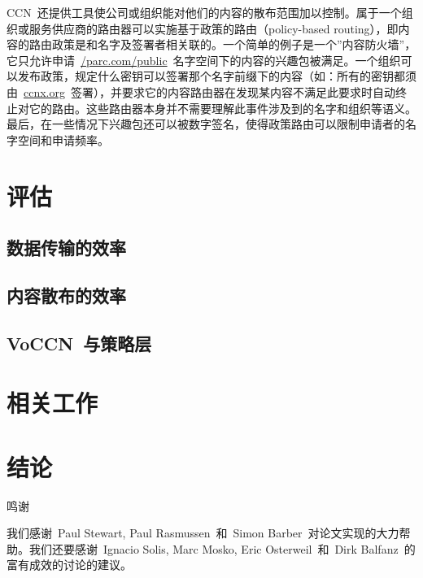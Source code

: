 CCN~还提供工具使公司或组织能对他们的内容的散布范围加以控制。属于一个组织或服务供应商的路由器可以实施基于政策的路由（policy-based routing），即内容的路由政策是和名字及签署者相关联的。一个简单的例子是一个”内容防火墙”，它只允许申请~\url{/parc.com/public}~名字空间下的内容的兴趣包被满足。一个组织可以发布政策，规定什么密钥可以签署那个名字前缀下的内容（如：所有的密钥都须由~\url{ccnx.org}~签署），并要求它的内容路由器在发现某内容不满足此要求时自动终止对它的路由。这些路由器本身并不需要理解此事件涉及到的名字和组织等语义。最后，在一些情况下兴趣包还可以被数字签名，使得政策路由可以限制申请者的名字空间和申请频率。

\section{评估}
\label{sec:6}

\subsection{数据传输的效率}
\label{sec:6.1}
	
\subsection{内容散布的效率}
\label{sec:6.2}

\subsection{VoCCN~与策略层}
\label{sec:6.3}

\section{相关工作}
\label{sec:7}


\section{结论}
\label{sec:8}

\heiti
鸣谢

\songti
我们感谢~Paul Stewart, Paul Rasmussen~和~Simon Barber~对论文实现的大力帮助。我们还要感谢~Ignacio Solis, Marc Mosko, Eric Osterweil~和~Dirk Balfanz~的富有成效的讨论的建议。

